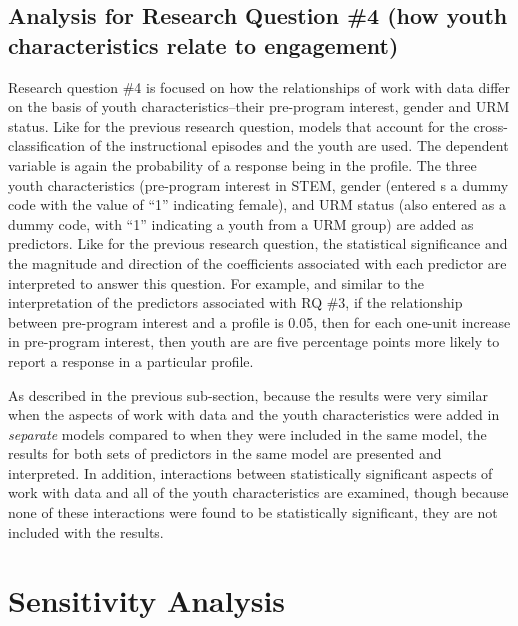 \documentclass[]{book}
\theoremstyle{definition}
\theoremstyle{definition}
\theoremstyle{definition}
\theoremstyle{remark}
\begin{document}
\subsection{Analysis for Research Question \#4 (how youth
characteristics relate to
engagement)}\label{analysis-for-research-question-4-how-youth-characteristics-relate-to-engagement}

Research question \#4 is focused on how the relationships of work with
data differ on the basis of youth characteristics--their pre-program
interest, gender and URM status. Like for the previous research
question, models that account for the cross-classification of the
instructional episodes and the youth are used. The dependent variable is
again the probability of a response being in the profile. The three
youth characteristics (pre-program interest in STEM, gender (entered s a
dummy code with the value of ``1'' indicating female), and URM status
(also entered as a dummy code, with ``1'' indicating a youth from a URM
group) are added as predictors. Like for the previous research question,
the statistical significance and the magnitude and direction of the
coefficients associated with each predictor are interpreted to answer
this question. For example, and similar to the interpretation of the
predictors associated with RQ \#3, if the relationship between
pre-program interest and a profile is 0.05, then for each one-unit
increase in pre-program interest, then youth are are five percentage
points more likely to report a response in a particular profile.

As described in the previous sub-section, because the results were very
similar when the aspects of work with data and the youth characteristics
were added in \emph{separate} models compared to when they were included
in the same model, the results for both sets of predictors in the same
model are presented and interpreted. In addition, interactions between
statistically significant aspects of work with data and all of the youth
characteristics are examined, though because none of these interactions
were found to be statistically significant, they are not included with
the results.

\section{Sensitivity Analysis}\label{sensitivity-analysis}
\end{document}
